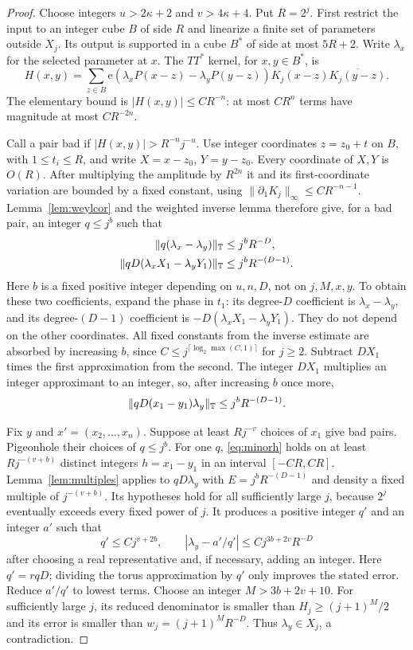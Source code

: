 \documentclass[11pt,oneside]{article}
\theoremstyle{definition}\newtheorem{definition}[theorem]{Definition}
\theoremstyle{remark}\newtheorem{remark}[theorem]{Remark}
\newcommand{\ee}[1]{\mathrm e\!\left(#1\right)}
\begin{document}
\begin{proof}
Choose integers $u>2\kappa+2$ and $v>4\kappa+4$. Put $R=2^j$.
First restrict the input to an integer cube $B$ of side $R$ and linearize a
finite set of parameters outside $X_j$. Its output is supported in a cube
$B^*$ of side at most $5R+2$. Write $\lambda_x$ for the selected parameter at
$x$. The $TT^*$ kernel, for $x,y\in B^*$, is
\[
 H(x,y)=\sum_{z\in B}\ee{\lambda_xP(x-z)-\lambda_yP(y-z)}
                      K_j(x-z)\overline{K_j(y-z)}.
\]
The elementary bound is $|H(x,y)|\leq CR^{-n}$: at most $CR^n$ terms have
magnitude at most $CR^{-2n}$.

Call a pair bad if $|H(x,y)|>R^{-n}j^{-u}$.
Use integer coordinates $z=z_0+t$ on $B$, with $1\leq t_i\leq R$, and write
$X=x-z_0$, $Y=y-z_0$. Every coordinate of $X,Y$ is $O(R)$.
After multiplying the amplitude by $R^{2n}$ it and its first-coordinate
variation are bounded by a fixed constant, using
$\|\partial_1K_j\|_\infty\leq CR^{-n-1}$.
Lemma~\ref{lem:weylcor} and the weighted inverse lemma therefore give, for a
bad pair, an integer $q\leq j^b$ such that
\begin{align*}
 \|q(\lambda_x-\lambda_y)\|_\mathbb T&\leq j^bR^{-D},\\
 \|qD(\lambda_xX_1-\lambda_yY_1)\|_\mathbb T&\leq j^bR^{-(D-1)}.
\end{align*}
Here $b$ is a fixed positive integer depending on $u,n,D$, not on $j,M,x,y$.
To obtain these two coefficients, expand the phase in $t_1$: its degree-$D$
coefficient is $\lambda_x-\lambda_y$, and its degree-$(D-1)$ coefficient is
$-D(\lambda_xX_1-\lambda_yY_1)$. They do not depend on the other coordinates.
All fixed constants from the inverse estimate are absorbed by increasing
$b$, since $C\leq j^{\lceil\log_2\max(C,1)\rceil}$ for $j\geq2$.
Subtract $D X_1$ times the first approximation from the second. The integer
$D X_1$ multiplies an integer approximant to an integer, so, after increasing
$b$ once more,
\begin{equation}\label{eq:minorh}
 \|qD(x_1-y_1)\lambda_y\|_\mathbb T\leq j^bR^{-(D-1)}.
\end{equation}

Fix $y$ and $x'=(x_2,\ldots,x_n)$. Suppose at least $Rj^{-v}$ choices of
$x_1$ give bad pairs. Pigeonhole their choices of $q\leq j^b$.
For one $q$, \eqref{eq:minorh} holds on at least $Rj^{-(v+b)}$ distinct
integers $h=x_1-y_1$ in an interval $[-CR,CR]$.
Lemma~\ref{lem:multiples} applies to $qD\lambda_y$ with
$E=j^bR^{-(D-1)}$ and density a fixed multiple of $j^{-(v+b)}$.
Its hypotheses hold for all sufficiently large $j$, because $2^j$ eventually
exceeds every fixed power of $j$. It produces a positive integer $q'$ and
an integer $a'$ such that
\[
 q'\leq Cj^{v+2b},\qquad
 |\lambda_y-a'/q'|\leq Cj^{3b+2v}R^{-D}
\]
after choosing a real representative and, if necessary, adding an integer.
Here $q'=rqD$; dividing the torus approximation by $q'$ only improves the
stated error. Reduce $a'/q'$ to lowest terms.
Choose an integer $M>3b+2v+10$. For sufficiently large $j$, its reduced
denominator is smaller than $H_j\geq(j+1)^M/2$ and its error is smaller than
$w_j=(j+1)^MR^{-D}$. Thus $\lambda_y\in X_j$, a contradiction.


\end{proof}
\end{document}
